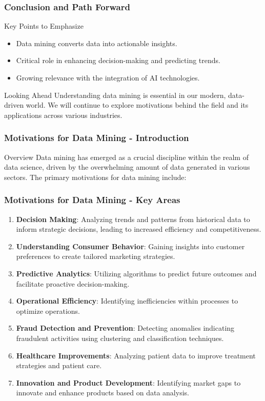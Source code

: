 \documentclass[aspectratio=169]{beamer}
\begin{document}
\begin{frame}[fragile]
    \frametitle{Conclusion and Path Forward}
    \begin{block}{Key Points to Emphasize}
        \begin{itemize}
            \item Data mining converts data into actionable insights.
            \item Critical role in enhancing decision-making and predicting trends.
            \item Growing relevance with the integration of AI technologies.
        \end{itemize}
    \end{block}
    \begin{block}{Looking Ahead}
        Understanding data mining is essential in our modern, data-driven world. We will continue to explore motivations behind the field and its applications across various industries.
    \end{block}
\end{frame}

\begin{frame}[fragile]
    \frametitle{Motivations for Data Mining - Introduction}
    \begin{block}{Overview}
    Data mining has emerged as a crucial discipline within the realm of data science, driven by the overwhelming amount of data generated in various sectors. The primary motivations for data mining include:
    \end{block}
\end{frame}

\begin{frame}[fragile]
    \frametitle{Motivations for Data Mining - Key Areas}
    \begin{enumerate}
        \item \textbf{Decision Making}: Analyzing trends and patterns from historical data to inform strategic decisions, leading to increased efficiency and competitiveness. 
        \item \textbf{Understanding Consumer Behavior}: Gaining insights into customer preferences to create tailored marketing strategies. 
        \item \textbf{Predictive Analytics}: Utilizing algorithms to predict future outcomes and facilitate proactive decision-making. 
        \item \textbf{Operational Efficiency}: Identifying inefficiencies within processes to optimize operations.
        \item \textbf{Fraud Detection and Prevention}: Detecting anomalies indicating fraudulent activities using clustering and classification techniques.
        \item \textbf{Healthcare Improvements}: Analyzing patient data to improve treatment strategies and patient care.
        \item \textbf{Innovation and Product Development}: Identifying market gaps to innovate and enhance products based on data analysis.
    \end{enumerate}
\end{frame}
\end{document}
